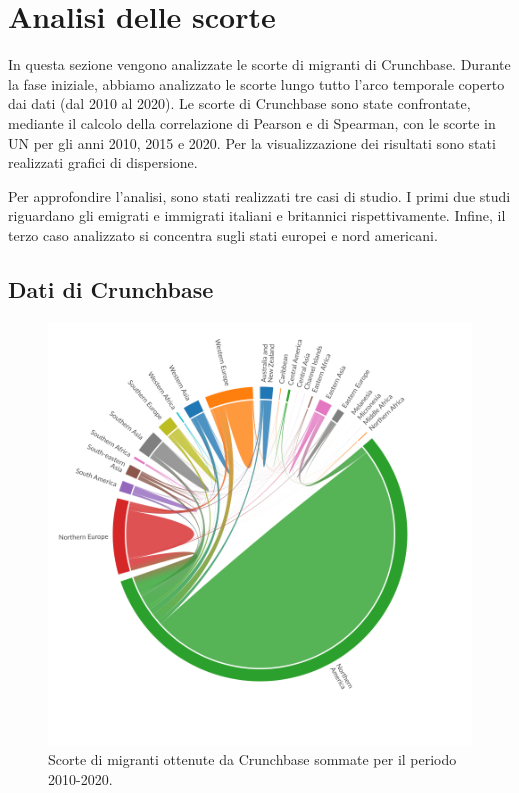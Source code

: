 \section{Analisi delle scorte}
\label{sec:analisi_scorte}
In questa sezione vengono analizzate le scorte di migranti di Crunchbase. 
Durante la fase iniziale, abbiamo analizzato le scorte lungo tutto l'arco temporale coperto dai dati (dal 2010 al 2020). 
Le scorte di Crunchbase sono state confrontate, mediante il calcolo della correlazione di Pearson e di Spearman, con le scorte in UN per gli anni 2010, 2015 e 2020. 
Per la visualizzazione dei risultati sono stati realizzati grafici di dispersione.

Per approfondire l'analisi, sono stati realizzati tre casi di studio. I primi due studi riguardano gli emigrati e immigrati italiani e britannici rispettivamente. Infine, il terzo caso analizzato si concentra sugli stati europei e nord americani. 

\subsection{Dati di Crunchbase}
\label{stockCrunchbase}
\begin{figure}[t]
    \centering
    \includegraphics[width=\textwidth]{images/SVG/Chords/stocks/stock_chord_all.png}
    \caption{Scorte di migranti ottenute da Crunchbase sommate per il periodo 2010-2020.}
    \label{fig:chordCrunchbase_stock_all}
\end{figure}

